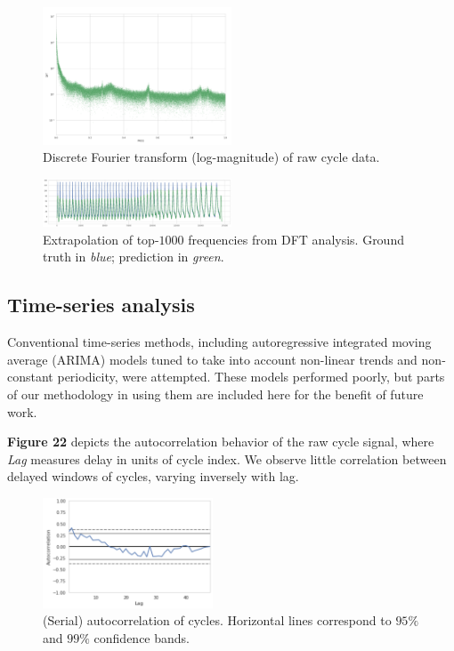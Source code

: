 \documentclass[letterpaper, 10 pt, conference]{ieeeconf}  %
\begin{document}
\label{Logfourier}
\begin{figure}[h!]
	\centering
	\includegraphics[width=0.5\textwidth]{assets/fourier_analysis.png}
  \caption{Discrete Fourier transform (log-magnitude) of raw cycle data.}
\end{figure}

\label{Extrapolation}
\begin{figure}[h!]
	\centering
	\includegraphics[width=0.5\textwidth]{assets/fourier_extrapolation.png}
  \caption{Extrapolation of top-$1000$ frequencies from DFT analysis. Ground truth in \textit{blue}; prediction in \textit{green}.}
\end{figure}

\subsection{Time-series analysis}

Conventional time-series methods, including autoregressive integrated moving average (ARIMA) models tuned to take into account non-linear trends and non-constant periodicity, were attempted. These models performed poorly, but parts of our methodology in using them are included here for the benefit of future work.

\textbf{Figure 22} depicts the autocorrelation behavior of the raw cycle signal, where \textit{Lag} measures delay in units of cycle index. We observe little correlation between delayed windows of cycles, varying inversely with lag.

\label{Autocorrelation}
\begin{figure}[h]
	\centering
	\includegraphics[width=0.45\textwidth]{assets/autocorrelation.png}
  \caption{(Serial) autocorrelation of cycles. Horizontal lines correspond to $95\%$ and $99\%$ confidence bands.}
\end{figure}
\end{document}
